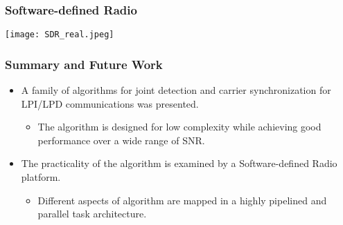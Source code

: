   \begin{frame}
    \frametitle{Software-defined Radio}
    \begin{center}
      \texttt{[image: SDR\_real.jpeg]}
    \end{center}

  \end{frame} 


  \begin{frame}
    \frametitle{Summary and Future Work}
    \begin{itemize}
      \item A family of algorithms for joint detection and carrier synchronization for LPI/LPD communications was presented.
      \begin{itemize}
        \item The algorithm is designed for low complexity while achieving good performance over a wide range of SNR.
      \end{itemize}
      \item The practicality of the algorithm is examined by a Software-defined Radio platform.
      \begin{itemize}
        \item Different aspects of algorithm are mapped in a highly pipelined and parallel task architecture.
      \end{itemize}
    \end{itemize}

    

    

    
  \end{frame} 